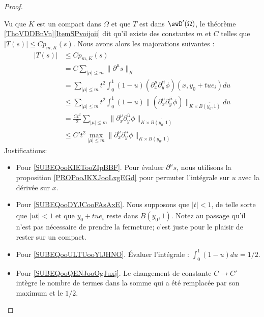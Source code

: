 \begin{proof}
\begin{subproof}
		Vu que \( K\) est un compact dans \( \Omega\) et que \( T\) est dans \( \swD'(\Omega)\), le théorème \ref{ThoVDDBnVn}\ref{ItemSPvoijoii} dit qu'il existe des constantes \( m\) et \( C\) telles que \( | T(s) |\leq Cp_{m,K}(s)\). Nous avons alors les majorations suivantes :
		\begin{subequations}        \label{SUBEQSooYPLGooOFMSyJ}
			\begin{align}
				| T(s) | & \leq C p_{m,K}(s)                                                                                                                                     \\
				         & =C\sum_{| \mu |\leq m}\| \partial^{\mu}s \|_K                                                                                                         \\
				         & =\sum_{|\mu|\leq m}t^2\int_0^1(1-u)(\partial_x^{\mu}\partial_y^{ii}\phi)(x,y_0+tue_i)du       \label{SUBEQooKIETooZIpBBF}                             \\
				         & \leq\sum_{|\mu|\leq m}t^2\int_0^1(1-u)\| (\partial_x^{\mu}\partial_y^{ii}\phi)\|_{K\times \overline{ B(y_0,1) }} du       \label{SUBEQooDYJCooFAsAxE} \\
				         & =\frac{ Ct^2 }{2}\sum_{| \mu |\leq m}\| \partial_x^{\mu}\partial_y^{ii}\phi \|_{K\times \overline{ B(y_0,1) }}  \label{SUBEQooULTUooYlJHNO}           \\
				         & \leq C't^2 \max_{| \mu |\leq m}\| \partial_x^{\mu}\partial_y^{ii}\phi \|_{K\times \overline{ B(y_0,1) }}  \label{SUBEQooQENJooOgJuxj}
			\end{align}
		\end{subequations}
		Justifications:
		\begin{itemize}
			\item Pour \eqref{SUBEQooKIETooZIpBBF}. Pour évaluer \( \partial^{\mu}s\), nous utilisons la proposition \ref{PROPooJKXJooLxgEGd} pour permuter l'intégrale sur \( u\) avec la dérivée sur \( x\).
			\item Pour \eqref{SUBEQooDYJCooFAsAxE}. Nous supposons que \( | t |<1\), de telle sorte que \( | ut |<1\) et que \( y_0+tue_i\) reste dans \( \overline{ B(y_0,1) }\). Notez au passage qu'il n'est pas nécessaire de prendre la fermeture; c'est juste pour le plaisir de rester sur un compact.
			\item Pour \eqref{SUBEQooULTUooYlJHNO}. Évaluer l'intégrale : \( \int_0^1(1-u)du=1/2\).
			\item Pour \eqref{SUBEQooQENJooOgJuxj}. Le changement de constante \( C\to C'\) intègre le nombre de termes dans la somme qui a été remplacée par son maximum et le \( 1/2\).

\end{itemize}
\end{subproof}
\end{proof}
